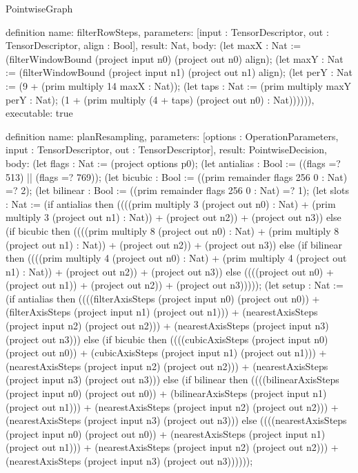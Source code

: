 \begin{lexlean}{PointwiseGraph}
\begin{semanticmodule}
definition{
  name: filterRowSteps,
  parameters: [input : TensorDescriptor, out : TensorDescriptor, align : Bool],
  result: Nat,
  body: (let maxX : Nat := (filterWindowBound (project input n0) (project out n0) align);
      (let maxY : Nat := (filterWindowBound (project input n1) (project out n1) align);
      (let perY : Nat := (9 + (prim multiply 14 maxX : Nat));
      (let taps : Nat := (prim multiply maxY perY : Nat);
      (1 + (prim multiply (4 + taps) (project out n0) : Nat)))))),
  executable: true
}

definition{
  name: planResampling,
  parameters: [options : OperationParameters, input : TensorDescriptor, out : TensorDescriptor],
  result: PointwiseDecision,
  body: (let flags : Nat := (project options p0);
      (let antialias : Bool := ((flags =? 513) || (flags =? 769)); (let bicubic : Bool := ((prim remainder flags 256 0 : Nat) =? 2); (let bilinear : Bool := ((prim remainder flags 256 0 : Nat) =? 1); (let slots : Nat := (if antialias then ((((prim multiply 3 (project out n0) : Nat) + (prim multiply 3 (project out n1) : Nat)) + (project out n2)) + (project out n3)) else (if bicubic then ((((prim multiply 8 (project out n0) : Nat) + (prim multiply 8 (project out n1) : Nat)) + (project out n2)) + (project out n3)) else (if bilinear then ((((prim multiply 4 (project out n0) : Nat) + (prim multiply 4 (project out n1) : Nat)) + (project out n2)) + (project out n3)) else ((((project out n0) + (project out n1)) + (project out n2)) + (project out n3)))));
      (let setup : Nat := (if antialias then ((((filterAxisSteps (project input n0) (project out n0)) + (filterAxisSteps (project input n1) (project out n1))) + (nearestAxisSteps (project input n2) (project out n2))) + (nearestAxisSteps (project input n3) (project out n3))) else (if bicubic then ((((cubicAxisSteps (project input n0) (project out n0)) + (cubicAxisSteps (project input n1) (project out n1))) + (nearestAxisSteps (project input n2) (project out n2))) + (nearestAxisSteps (project input n3) (project out n3))) else (if bilinear then ((((bilinearAxisSteps (project input n0) (project out n0)) + (bilinearAxisSteps (project input n1) (project out n1))) + (nearestAxisSteps (project input n2) (project out n2))) + (nearestAxisSteps (project input n3) (project out n3))) else ((((nearestAxisSteps (project input n0) (project out n0)) + (nearestAxisSteps (project input n1) (project out n1))) + (nearestAxisSteps (project input n2) (project out n2))) + (nearestAxisSteps (project input n3) (project out n3))))));
}
\end{semanticmodule}
\end{lexlean}
